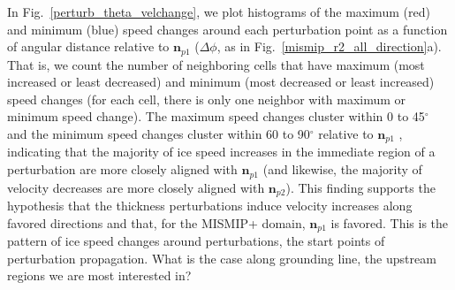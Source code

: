 \documentclass[tc, manuscript]{copernicus}
\begin{document}
In Fig.~\ref{perturb_theta_velchange}, we plot histograms of the maximum (red) and minimum (blue) speed changes around each perturbation point as a function of angular distance relative to $\mathbf{n}_{p1}$ ($\Delta\phi$, as in Fig.~\ref{mismip_r2_all_direction}a). That is, we count the number of neighboring cells that have maximum (most increased or least decreased) and minimum (most decreased or least increased) speed changes (for each cell, there is only one neighbor with maximum or minimum speed change).  %
The maximum speed changes cluster within 0 to 45$^\circ$ and the minimum speed changes cluster within 60 to 90$^\circ$ relative to $\mathbf{n}_{p1}$ , indicating that the majority of ice speed increases in the immediate region of a perturbation are more closely aligned with $\mathbf{n}_{p1}$ (and likewise, the majority of velocity decreases are more closely aligned with $\mathbf{n}_{p2}$). This finding supports the hypothesis that the thickness perturbations induce velocity increases along favored directions and that, for the MISMIP+ domain, $\mathbf{n}_{p1}$ is favored. This is the pattern of ice speed changes around perturbations, the start points of perturbation propagation. What is the case along grounding line, the upstream regions we are most interested in?


\end{document}
